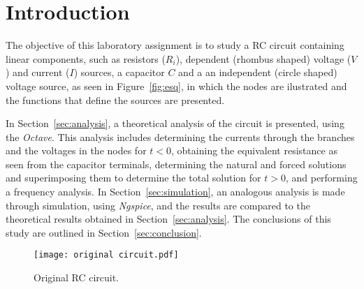 \section{Introduction}
\label{sec:introduction}

The objective of this laboratory assignment is to study a RC circuit containing linear components, 
such as resistors ($R_i$), dependent (rhombus shaped) voltage ($V$) and current ($I$) 
sources, a capacitor $C$ and a an independent (circle shaped) voltage source, as seen in Figure~\ref{fig:esq}, in which the nodes are ilustrated and the functions that define the sources are presented.


In Section~\ref{sec:analysis}, a theoretical analysis of the circuit is
presented, using the \textit{Octave}. This analysis includes determining the currents through the branches and the voltages in the nodes for $t<0$, obtaining the equivalent resistance as seen from the capacitor terminals, determining the natural and forced solutions and superimposing them to determine the total solution for $t>0$, and performing a frequency analysis. 
In Section~\ref{sec:simulation}, an analogous analysis is made through simulation, using \textit{Ngspice}, and the results are compared to the theoretical results obtained in
Section~\ref{sec:analysis}. The conclusions of this study are outlined in
Section~\ref{sec:conclusion}.


\begin{figure}[h] \centering
    \texttt{[image: original circuit.pdf]}
    \caption{Original RC circuit.}
    \label{fig:OG_circ}
    \end{figure}
    



